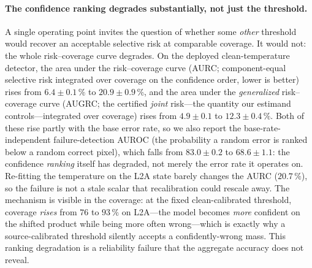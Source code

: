 \documentclass[preprint,3p,times]{elsarticle}
\begin{document}
\paragraph{The confidence ranking degrades substantially, not just the threshold.} A single operating point invites the question of whether some \emph{other} threshold would recover an acceptable selective risk at comparable coverage. It would not: the whole risk--coverage curve degrades. On the deployed clean-temperature detector, the area under the risk--coverage curve (AURC; component-equal selective risk integrated over coverage on the confidence order, lower is better) rises from $6.4 \pm 0.1\,\%$ to $20.9 \pm 0.9\,\%$, and the area under the \emph{generalized} risk--coverage curve (AUGRC; the certified \emph{joint} risk---the quantity our estimand controls---integrated over coverage) rises from $4.9 \pm 0.1$ to $12.3 \pm 0.4\,\%$. Both of these rise partly with the base error rate, so we also report the base-rate-independent failure-detection AUROC (the probability a random error is ranked below a random correct pixel), which falls from $83.0 \pm 0.2$ to $68.6 \pm 1.1$: the confidence \emph{ranking} itself has degraded, not merely the error rate it operates on. Re-fitting the temperature on the L2A state barely changes the AURC ($20.7\,\%$), so the failure is not a stale scalar that recalibration could rescale away. The mechanism is visible in the coverage: at the fixed clean-calibrated threshold, coverage \emph{rises} from $76$ to $93\,\%$ on L2A---the model becomes \emph{more} confident on the shifted product while being more often wrong---which is exactly why a source-calibrated threshold silently accepts a confidently-wrong mass. This ranking degradation is a reliability failure that the aggregate accuracy does not reveal.
\end{document}
